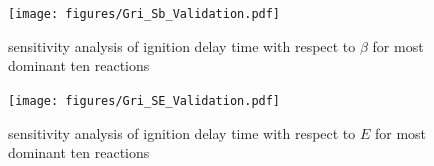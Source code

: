 \documentclass[preprint,review,12pt]{elsarticle}
\begin{document}
\begin{figure}
\centering
 {\texttt{[image: figures/Gri\_Sb\_Validation.pdf]}}
\caption{sensitivity analysis of ignition delay time with respect to $\beta$ for most dominant ten reactions}
    \label{fig:figure8}
\end{figure}

\begin{figure}
\centering
 {\texttt{[image: figures/Gri\_SE\_Validation.pdf]}}
\caption{sensitivity analysis of ignition delay time with respect to $E$ for most dominant ten reactions}
    \label{fig:figure9}
\end{figure}

%
%
 
\end{document}
